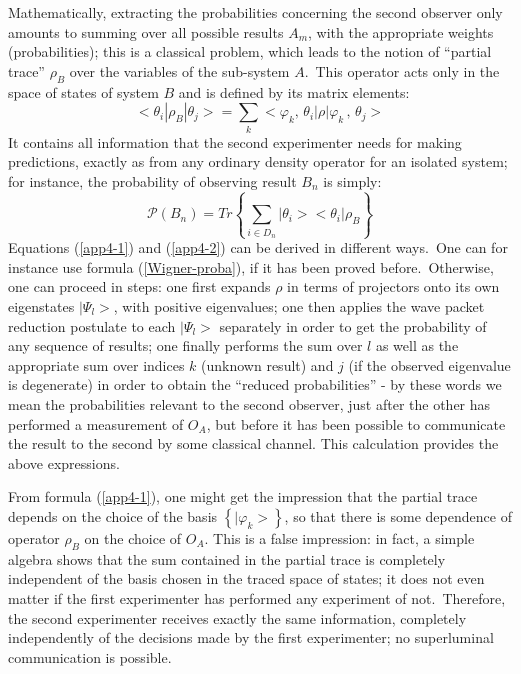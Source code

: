 \documentclass[12pt,onecolumn]{article}%
\begin{document}
Mathematically, extracting the probabilities concerning the second observer
only amounts to summing over all possible results $A_{m}$, with the
appropriate weights (probabilities); this is a classical problem, which leads
to the notion of ``partial trace'' $\rho_{B}$ over the variables of the
sub-system $A$.\ This operator acts only in the space of states of system $B$
and is defined by its matrix elements:%
\begin{equation}
<\theta_{i}|\rho_{B}|\theta_{j}>=\sum_{k}<\varphi_{k},\,\theta_{i}%
|\rho|\varphi_{k}\,,\,\theta_{j}> \label{app4-1}%
\end{equation}
It contains all information that the second experimenter needs for making
predictions, exactly as from any ordinary density operator for an isolated
system; for instance, the probability of observing result $B_{n}$ is simply:%
\begin{equation}
\mathcal{P}(B_{n})=Tr\left\{  \sum_{i\in D_{n}}|\theta_{i}><\theta_{i}%
|\rho_{B}\right\}  \label{app4-2}%
\end{equation}
Equations (\ref{app4-1}) and (\ref{app4-2}) can be derived in different
ways.\ One can for instance use formula (\ref{Wigner-proba}), if it has been
proved before.\ Otherwise, one can proceed in steps: one first expands $\rho$
in terms of projectors onto its own eigenstates $|\Psi_{l}>$, with positive
eigenvalues; one then applies the wave packet reduction postulate to each
$|\Psi_{l}>$ separately in order to get the probability of any sequence of
results; one finally performs the sum over $l$ as well as the appropriate sum
over indices $k$ (unknown result) and $j$ (if the observed eigenvalue is
degenerate) in order to obtain the ``reduced probabilities'' - by these words
we mean the probabilities relevant to the second observer, just after the
other has performed a measurement of $O_{A}$, but before it has been possible
to communicate the result to the second by some classical channel. This
calculation provides the above expressions.

From formula (\ref{app4-1}), one might get the impression that the partial
trace depends on the choice of the basis $\left\{  |\varphi_{k}>\right\}
$, so that there is some dependence of operator $\rho_{B}$ on the choice of
$O_{A}$. This is a false impression: in fact, a simple algebra shows that the
sum contained in the partial trace is completely independent of the basis
chosen in the traced space of states; it does not even matter if the first
experimenter has performed any experiment of not.\ Therefore, the second
experimenter receives exactly the same information, completely independently
of the decisions made by the first experimenter; no superluminal communication
is possible.
\end{document}
